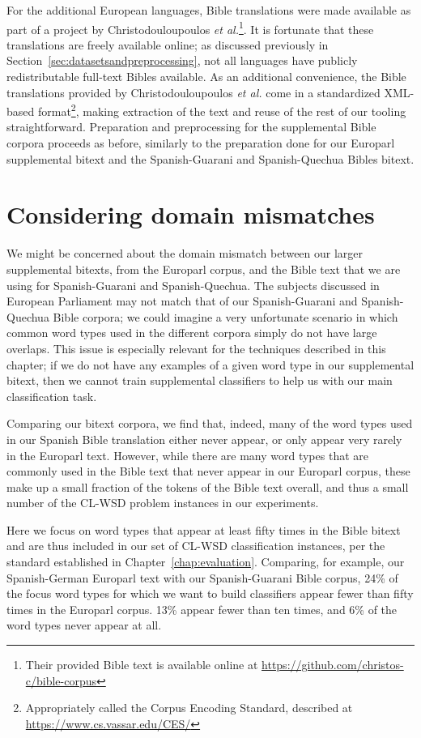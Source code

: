 For the additional European languages, Bible translations were made available
as part of a project by Christodouloupoulos \emph{et
al.}\cite{Christodouloupoulos2015}\footnote{Their provided Bible text is
available online at \url{https://github.com/christos-c/bible-corpus}}. It is
fortunate that these translations are freely available online; as discussed
previously in Section~\ref{sec:datasetsandpreprocessing}, not all languages
have publicly redistributable full-text Bibles available. As an additional
convenience, the Bible translations provided by Christodouloupoulos \emph{et
al.} come in a standardized XML-based format\footnote{Appropriately called the
Corpus Encoding Standard, described at \url{https://www.cs.vassar.edu/CES/}},
making extraction of the text and reuse of the rest of our tooling
straightforward. Preparation and preprocessing for the supplemental Bible
corpora proceeds as before, similarly to the preparation done for our Europarl
supplemental bitext and the Spanish-Guarani and Spanish-Quechua Bibles bitext.

\section{Considering domain mismatches}
\label{sec:domainmismatches}
We might be concerned about the domain mismatch between our larger supplemental
bitexts, from the Europarl corpus, and the Bible text that we are using for
Spanish-Guarani and Spanish-Quechua.
The subjects discussed in European Parliament may not match that of our
Spanish-Guarani and Spanish-Quechua Bible corpora; we could imagine a very
unfortunate scenario in which common word types used in the different corpora
simply do not have large overlaps.
This issue is especially relevant for the techniques described in this chapter;
if we do not have any examples of a given word type in our supplemental bitext,
then we cannot train supplemental classifiers to help us with our main
classification task.

Comparing our bitext corpora, we find that, indeed, many of the word types used
in our Spanish Bible translation either never appear, or only appear very
rarely in the Europarl text. However, while there are many word types that are
commonly used in the Bible text that never appear in our Europarl corpus, these
make up a small fraction of the tokens of the Bible text overall, and thus a
small number of the CL-WSD problem instances in our experiments.

Here we focus on word types that appear at least fifty times in the Bible
bitext and are thus included in our set of CL-WSD classification instances,
per the standard established in Chapter~\ref{chap:evaluation}.
Comparing, for example, our Spanish-German Europarl text with our
Spanish-Guarani Bible corpus, 24\% of the focus word types for which we want to
build classifiers appear fewer than fifty times in the Europarl corpus. 13\%
appear fewer than ten times, and 6\% of the word types never appear at all.

